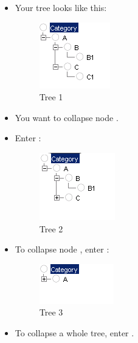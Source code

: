\begin{itemize}
\item Your tree looks like this:

\begin{figure}
\begin{center}
\includegraphics{PS/Treeexample}
\caption{Tree 1}
\label{treeexample}
\end{center}
\end{figure}

\item You want to collapse node . 
\item Enter :

\begin{figure}
\begin{center}
\includegraphics{PS/Treeexample2}
\caption{Tree 2}
\label{treeexample2}
\end{center}
\end{figure}

\item To collapse node , enter :

\begin{figure}
\begin{center}
\includegraphics{PS/Treeexample3}
\caption{Tree 3}
\label{treeexample3}
\end{center}
\end{figure}

\item To collapse a whole tree, enter .
\end{itemize}
